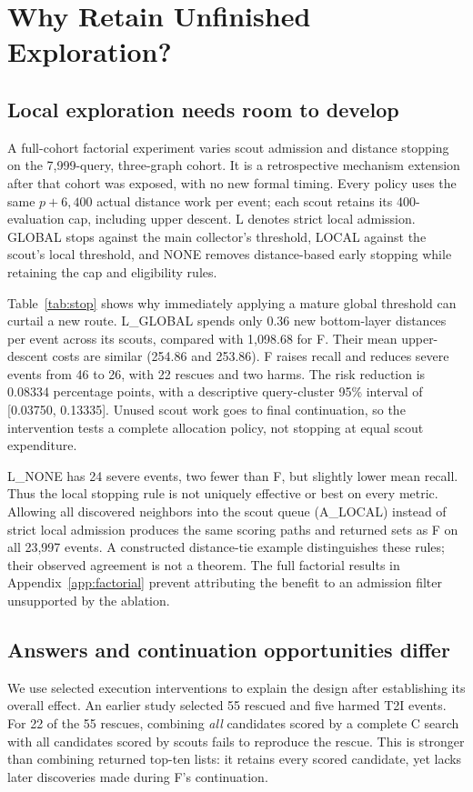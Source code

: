 \section{Why Retain Unfinished Exploration?}\label{sec:explanation}
\subsection{Local exploration needs room to develop}\label{sec:ablation}
A full-cohort factorial experiment varies scout admission and distance stopping on the 7,999-query, three-graph cohort. It is a retrospective mechanism extension after that cohort was exposed, with no new formal timing. Every policy uses the same $p+6{,}400$ actual distance work per event; each scout retains its 400-evaluation cap, including upper descent. L denotes strict local admission. GLOBAL stops against the main collector's threshold, LOCAL against the scout's local threshold, and NONE removes distance-based early stopping while retaining the cap and eligibility rules.



Table~\ref{tab:stop} shows why immediately applying a mature global threshold can curtail a new route. L\_GLOBAL spends only 0.36 new bottom-layer distances per event across its scouts, compared with 1,098.68 for F. Their mean upper-descent costs are similar (254.86 and 253.86). F raises recall and reduces severe events from 46 to 26, with 22 rescues and two harms. The risk reduction is 0.08334 percentage points, with a descriptive query-cluster 95\% interval of [0.03750, 0.13335]. Unused scout work goes to final continuation, so the intervention tests a complete allocation policy, not stopping at equal scout expenditure.

L\_NONE has 24 severe events, two fewer than F, but slightly lower mean recall. Thus the local stopping rule is not uniquely effective or best on every metric. Allowing all discovered neighbors into the scout queue (A\_LOCAL) instead of strict local admission produces the same scoring paths and returned sets as F on all 23,997 events. A constructed distance-tie example distinguishes these rules; their observed agreement is not a theorem. The full factorial results in Appendix~\ref{app:factorial} prevent attributing the benefit to an admission filter unsupported by the ablation.

\subsection{Answers and continuation opportunities differ}
We use selected execution interventions to explain the design after establishing its overall effect. An earlier study selected 55 rescued and five harmed T2I events. For 22 of the 55 rescues, combining \emph{all} candidates scored by a complete C search with all candidates scored by scouts fails to reproduce the rescue. This is stronger than combining returned top-ten lists: it retains every scored candidate, yet lacks later discoveries made during F's continuation.

